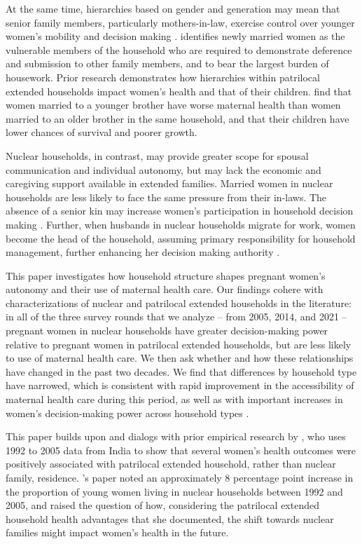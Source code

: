 \documentclass[10pt,twoside,reqno]{article}
\begin{document}
At the same time, hierarchies based on gender and generation may mean that senior family members, particularly mothers-in-law, exercise control over younger women’s mobility and decision making \citep{desai2005women, bloom2001dimensions}. \cite{gupta1999lifeboat} identifies newly married women as the  vulnerable members of the household who are required to demonstrate deference and submission to other family members, and to bear the largest burden of housework. Prior research demonstrates how hierarchies within patrilocal extended households impact women’s health and that of their children. \cite{coffey2022mothers} find that women married to a younger brother have worse maternal health than women married to an older brother in the same household, and that their children have lower chances of survival and poorer growth.

Nuclear households, in contrast, may provide greater scope for spousal communication and individual autonomy, but may lack the economic and caregiving support available in extended families. Married women in nuclear households are less likely to face the same pressure from their in-laws. The absence of a senior kin may increase women’s participation in household decision making \citep{simkhada2010role,char2010influence}. Further, when husbands in nuclear households migrate for work, women become the head of the household, assuming primary responsibility for  household management, further enhancing her decision making authority \citep{desai2008negotiated}. 

This paper investigates how household structure shapes pregnant women's autonomy and their use of maternal health care.  Our findings cohere with characterizations of nuclear and patrilocal extended households in the literature: in all of the three survey rounds that we analyze -- from 2005, 2014, and 2021 -- pregnant women in nuclear households have greater decision-making power relative to pregnant women in patrilocal extended households, but are less likely to use of maternal health care.  We then ask whether and how these relationships have changed in the past two decades.  We find that differences by household type have narrowed, which is consistent with rapid improvement in the accessibility of maternal health care during this period, as well as with important increases in women's decision-making power across household types\citep{ram2026investigation, gandhi2022predictors, muralidharan2017cycling, rai2022use} .

This paper builds upon and dialogs with prior empirical research by \cite{allendorf2013going}, who uses 1992 to 2005 data from India to show that several women's health outcomes were positively associated with patrilocal extended household, rather than nuclear family, residence.  \cite{allendorf2013going}'s paper noted an approximately 8 percentage point increase in the proportion of young women living in nuclear households between 1992 and 2005, and raised the question of how, considering the patrilocal extended household health advantages that she documented, the shift towards nuclear families might impact women's health in the future.  
\end{document}
